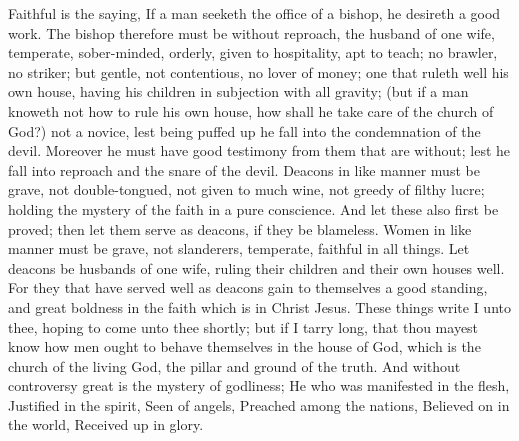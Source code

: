 Faithful is the saying, If a man seeketh the office of a bishop, he desireth a good work. The bishop therefore must be without reproach, the husband of one wife, temperate, sober-minded, orderly, given to hospitality, apt to teach; no brawler, no striker; but gentle, not contentious, no lover of money; one that ruleth well his own house, having his children in subjection with all gravity; (but if a man knoweth not how to rule his own house, how shall he take care of the church of God?) not a novice, lest being puffed up he fall into the condemnation of the devil. Moreover he must have good testimony from them that are without; lest he fall into reproach and the snare of the devil. Deacons in like manner must be grave, not double-tongued, not given to much wine, not greedy of filthy lucre; holding the mystery of the faith in a pure conscience. And let these also first be proved; then let them serve as deacons, if they be blameless. Women in like manner must be grave, not slanderers, temperate, faithful in all things. Let deacons be husbands of one wife, ruling their children and their own houses well. For they that have served well as deacons gain to themselves a good standing, and great boldness in the faith which is in Christ Jesus.  These things write I unto thee, hoping to come unto thee shortly; but if I tarry long, that thou mayest know how men ought to behave themselves in the house of God, which is the church of the living God, the pillar and ground of the truth. And without controversy great is the mystery of godliness; He who was manifested in the flesh, Justified in the spirit, Seen of angels, Preached among the nations, Believed on in the world, Received up in glory. 

